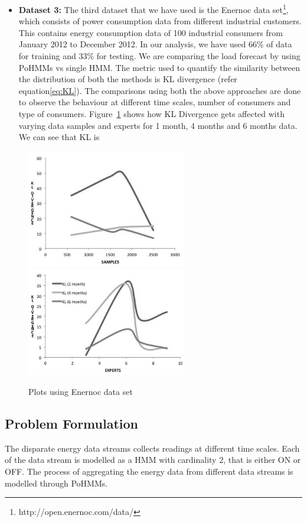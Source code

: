 \documentclass{acm_proc_article-sp}
\begin{document}
\begin{itemize}
\item \textbf{Dataset 3:} The third dataset that we have used is the Enernoc data set\footnote{http://open.enernoc.com/data/}, which consists of power consumption data from different industrial customers. This contains energy consumption data of 100 industrial consumers from January 2012 to December 2012. In our analysis, we have used 66\% of data for training and 33\% for testing. We are comparing the load forecast by using PoHMMs vs single HMM. The metric used to quantify the similarity between the distribution of both the methods is KL divergence (refer equation\ref{eq:KL}). The comparisons using both the above approaches are done to observe the behaviour at different time scales, number of consumers and type of consumers. Figure~\ref{fig:plot} shows how KL Divergence gets affected with varying data samples and experts for 1 month, 4 months and 6 months data. We can see that KL is 
\end{itemize}


\begin{figure}
\centering
\includegraphics[width=7cm]{./plot1.jpg}
\includegraphics[width=7cm]{./plot2.jpg}
\caption{Plots using Enernoc data set}
\label{fig:plot}
\end{figure}


\subsection{Problem Formulation}
The disparate energy data streams collects readings at different time scales. Each of the data stream is modelled as a HMM with cardinality $2$, that is either ON or OFF. The process of aggregating the energy data from different data streams is modelled through PoHMMs. 
\end{document}
